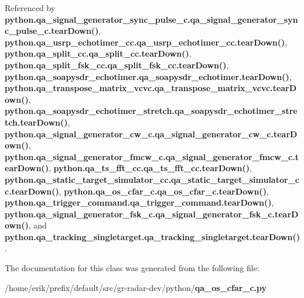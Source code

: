 Referenced by {\bf python.\+qa\+\_\+signal\+\_\+generator\+\_\+sync\+\_\+pulse\+\_\+c.\+qa\+\_\+signal\+\_\+generator\+\_\+sync\+\_\+pulse\+\_\+c.\+tear\+Down()}, {\bf python.\+qa\+\_\+usrp\+\_\+echotimer\+\_\+cc.\+qa\+\_\+usrp\+\_\+echotimer\+\_\+cc.\+tear\+Down()}, {\bf python.\+qa\+\_\+split\+\_\+cc.\+qa\+\_\+split\+\_\+cc.\+tear\+Down()}, {\bf python.\+qa\+\_\+split\+\_\+fsk\+\_\+cc.\+qa\+\_\+split\+\_\+fsk\+\_\+cc.\+tear\+Down()}, {\bf python.\+qa\+\_\+soapysdr\+\_\+echotimer.\+qa\+\_\+soapysdr\+\_\+echotimer.\+tear\+Down()}, {\bf python.\+qa\+\_\+transpose\+\_\+matrix\+\_\+vcvc.\+qa\+\_\+transpose\+\_\+matrix\+\_\+vcvc.\+tear\+Down()}, {\bf python.\+qa\+\_\+soapysdr\+\_\+echotimer\+\_\+stretch.\+qa\+\_\+soapysdr\+\_\+echotimer\+\_\+stretch.\+tear\+Down()}, {\bf python.\+qa\+\_\+signal\+\_\+generator\+\_\+cw\+\_\+c.\+qa\+\_\+signal\+\_\+generator\+\_\+cw\+\_\+c.\+tear\+Down()}, {\bf python.\+qa\+\_\+signal\+\_\+generator\+\_\+fmcw\+\_\+c.\+qa\+\_\+signal\+\_\+generator\+\_\+fmcw\+\_\+c.\+tear\+Down()}, {\bf python.\+qa\+\_\+ts\+\_\+fft\+\_\+cc.\+qa\+\_\+ts\+\_\+fft\+\_\+cc.\+tear\+Down()}, {\bf python.\+qa\+\_\+static\+\_\+target\+\_\+simulator\+\_\+cc.\+qa\+\_\+static\+\_\+target\+\_\+simulator\+\_\+cc.\+tear\+Down()}, {\bf python.\+qa\+\_\+os\+\_\+cfar\+\_\+c.\+qa\+\_\+os\+\_\+cfar\+\_\+c.\+tear\+Down()}, {\bf python.\+qa\+\_\+trigger\+\_\+command.\+qa\+\_\+trigger\+\_\+command.\+tear\+Down()}, {\bf python.\+qa\+\_\+signal\+\_\+generator\+\_\+fsk\+\_\+c.\+qa\+\_\+signal\+\_\+generator\+\_\+fsk\+\_\+c.\+tear\+Down()}, and {\bf python.\+qa\+\_\+tracking\+\_\+singletarget.\+qa\+\_\+tracking\+\_\+singletarget.\+tear\+Down()}.



The documentation for this class was generated from the following file\+:\begin{DoxyCompactItemize}
\item 
/home/erik/prefix/default/src/gr-\/radar-\/dev/python/{\bf qa\+\_\+os\+\_\+cfar\+\_\+c.\+py}\end{DoxyCompactItemize}
